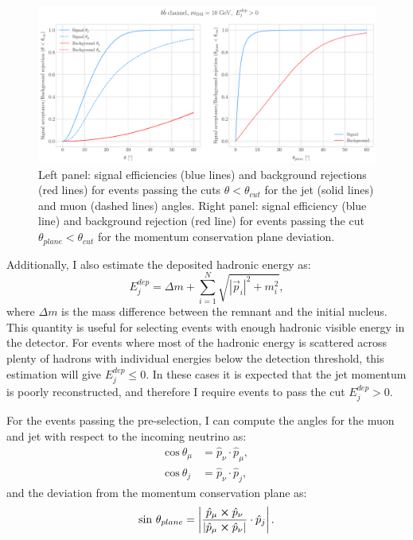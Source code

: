 \begin{figure}[t]
	\centering
	\includegraphics[width=0.95\linewidth]{Images/DM_Analysis/solardm_bb_100_dis_angular_cuts.pdf}
	\caption[Signal efficiency and background rejection for the $b\bar{b}$ sample with $m_{\mathrm{DM}} = 10 \ \mathrm{GeV}$ as a function of the angular cuts.]{Left panel: signal efficiencies (blue lines) and background rejections (red lines) for events passing the cuts $\theta < \theta_{cut}$ for the jet (solid lines) and muon (dashed lines) angles. Right panel: signal efficiency (blue line) and background rejection (red line) for events passing the cut $\theta_{plane} < \theta_{cut}$ for the momentum conservation plane deviation.}
	\label{fig:solardm_bb_100_dis_angular_cuts}
\end{figure}

Additionally, I also estimate the deposited hadronic energy as:
\begin{equation}
	E_{j}^{dep} = \Delta m + \sum_{i=1}^{N} \sqrt{|\vec{p}_{i}|^{2} + m_{i}^{2}},
\end{equation}
where $\Delta m$ is the mass difference between the remnant and the initial nucleus. This quantity is useful for selecting events with enough hadronic visible energy in the detector. For events where most of the hadronic energy is scattered across plenty of hadrons with individual energies below the detection threshold, this estimation will give $E_{j}^{dep} \leq 0$. In these cases it is expected that the jet momentum is poorly reconstructed, and therefore I require events to pass the cut $E_{j}^{dep} > 0$.

For the events passing the pre-selection, I can compute the angles for the muon and jet with respect to the incoming neutrino as:
\begin{align}
	\mathrm{cos} \ \theta_{\mu} &= \hat{p}_{\nu} \cdot \hat{p}_{\mu},\\
	\mathrm{cos} \ \theta_{j} &= \hat{p}_{\nu} \cdot \hat{p}_{j},
\end{align}
and the deviation from the momentum conservation plane as:
\begin{equation}
	\mathrm{sin} \ \theta_{plane} = \left|\frac{\hat{p}_{\mu} \cross \hat{p}_{\nu}}{|\hat{p}_{\mu} \cross \hat{p}_{\nu}|} \cdot \hat{p}_{j}\right|.
\end{equation}

